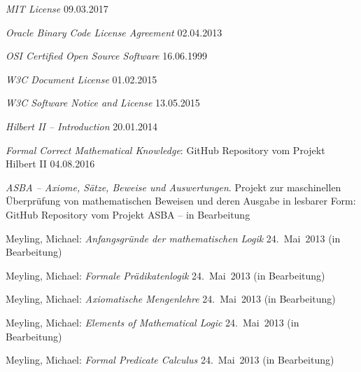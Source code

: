 \begin{flushleft}
\begin{thebibliography}{12}
		\emph{MIT License}
		09.03.2017

		\emph{Oracle Binary Code License Agreement}
		02.04.2013

		\emph{OSI Certified Open Source Software}
		16.06.1999

		\emph{W3C Document License}
		01.02.2015

		\emph{W3C Software Notice and License}
		13.05.2015

		\emph{Hilbert II -- Introduction}
		20.01.2014

		\emph{Formal Correct Mathematical Knowledge}:
		GitHub Repository vom Projekt Hilbert II
		04.08.2016

		\emph{ASBA -- Axiome, Sätze, Beweise und Auswertungen}.
		Projekt zur maschinellen Überprüfung von mathematischen Beweisen
		und deren Ausgabe in lesbarer Form:
		GitHub Repository vom Projekt ASBA
		-- in Bearbeitung

		Meyling, Michael:
		\emph{Anfangsgründe der mathematischen Logik}
		24.~Mai~2013 (in Bearbeitung)

		Meyling, Michael:
		\emph{Formale Prädikatenlogik}
		24.~Mai~2013 (in Bearbeitung)

		Meyling, Michael:
		\emph{Axiomatische Mengenlehre}
		24.~Mai~2013 (in Bearbeitung)

		Meyling, Michael:
		\emph{Elements of Mathematical Logic}
		24.~Mai~2013 (in Bearbeitung)

		Meyling, Michael:
		\emph{Formal Predicate Calculus}
		24.~Mai~2013 (in Bearbeitung)


\end{thebibliography}
\end{flushleft}
